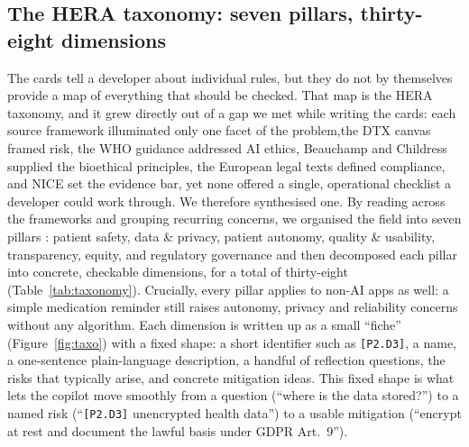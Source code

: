 \documentclass[11pt]{article}
\begin{document}
\subsection{The HERA taxonomy: seven pillars, thirty-eight dimensions}
The cards tell a developer about individual rules, but they do not by themselves provide
a map of everything that should be checked. That map is the HERA taxonomy, and it
grew directly out of a gap we met while writing the cards: each source framework
illuminated only one facet of the problem,the DTX canvas framed risk, the WHO guidance
addressed AI ethics, Beauchamp and Childress supplied the bioethical principles, the
European legal texts defined compliance, and NICE set the evidence bar, yet none offered
a single, operational checklist a developer could work through. We therefore synthesised
one. By reading across the frameworks and grouping recurring concerns, we organised the
field into seven pillars : patient safety, data \& privacy, patient autonomy,
quality \& usability, transparency, equity, and regulatory governance and then
decomposed each pillar into concrete, checkable dimensions, for a total of
thirty-eight (Table~\ref{tab:taxonomy}). Crucially, every pillar applies to non-AI apps
as well: a simple medication reminder still raises autonomy, privacy and reliability
concerns without any algorithm.
Each dimension is written up as a small ``fiche'' (Figure~\ref{fig:taxo}) with a fixed
shape: a short identifier such as \texttt{[P2.D3]}, a name, a one-sentence plain-language
description, a handful of reflection questions, the risks that typically arise, and
concrete mitigation ideas. This fixed shape is what lets the copilot move smoothly from a
question (``where is the data stored?'') to a named risk (``\texttt{[P2.D3]} unencrypted
health data'') to a usable mitigation (``encrypt at rest and document the lawful basis
under GDPR Art.~9'').
\end{document}

